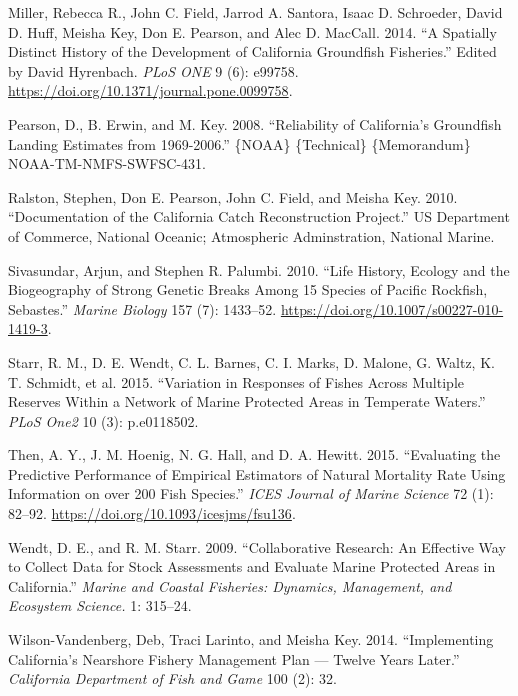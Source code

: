 \documentclass[11pt,
  english,
  letterpaper,
]{article}
\newlength{\cslhangindent}
\newenvironment{CSLReferences}[2] %
 {%
  \setlength{\parindent}{0pt}
  \ifodd #1 \everypar{\setlength{\hangindent}{\cslhangindent}}\ignorespaces\fi
  \ifnum #2 > 0
  \setlength{\parskip}{#2\baselineskip}
  \fi
 }%
 {}
\begin{document}
\begin{CSLReferences}{1}{0}
\leavevmode{}%
Miller, Rebecca R., John C. Field, Jarrod A. Santora, Isaac D. Schroeder, David D. Huff, Meisha Key, Don E. Pearson, and Alec D. MacCall. 2014. {``A {Spatially} {Distinct} {History} of the {Development} of {California} {Groundfish} {Fisheries}.''} Edited by David Hyrenbach. \emph{PLoS ONE} 9 (6): e99758. \url{https://doi.org/10.1371/journal.pone.0099758}.

\leavevmode{}%
Pearson, D., B. Erwin, and M. Key. 2008. {``Reliability of {California}'s {Groundfish} {Landing} {Estimates} from 1969-2006.''} \{NOAA\} \{Technical\} \{Memorandum\} NOAA-TM-NMFS-SWFSC-431.

\leavevmode{}%
Ralston, Stephen, Don E. Pearson, John C. Field, and Meisha Key. 2010. {``Documentation of the {California} Catch Reconstruction Project.''} US Department of Commerce, National Oceanic; Atmospheric Adminstration, National Marine.

\leavevmode{}%
Sivasundar, Arjun, and Stephen R. Palumbi. 2010. {``Life History, Ecology and the Biogeography of Strong Genetic Breaks Among 15 Species of {Pacific} Rockfish, {Sebastes}.''} \emph{Marine Biology} 157 (7): 1433--52. \url{https://doi.org/10.1007/s00227-010-1419-3}.

\leavevmode{}%
Starr, R. M., D. E. Wendt, C. L. Barnes, C. I. Marks, D. Malone, G. Waltz, K. T. Schmidt, et al. 2015. {``Variation in Responses of Fishes Across Multiple Reserves Within a Network of Marine Protected Areas in Temperate Waters.''} \emph{PLoS One2} 10 (3): p.e0118502.

\leavevmode{}%
Then, A. Y., J. M. Hoenig, N. G. Hall, and D. A. Hewitt. 2015. {``Evaluating the Predictive Performance of Empirical Estimators of Natural Mortality Rate Using Information on over 200 Fish Species.''} \emph{ICES Journal of Marine Science} 72 (1): 82--92. \url{https://doi.org/10.1093/icesjms/fsu136}.

\leavevmode{}%
Wendt, D. E., and R. M. Starr. 2009. {``Collaborative Research: An Effective Way to Collect Data for Stock Assessments and Evaluate Marine Protected Areas in {C}alifornia.''} \emph{Marine and Coastal Fisheries: Dynamics, Management, and Ecosystem Science.} 1: 315--24.

\leavevmode{}%
Wilson-Vandenberg, Deb, Traci Larinto, and Meisha Key. 2014. {``Implementing {California}'s {Nearshore} {Fishery} {Management} {Plan} --- Twelve Years Later.''} \emph{California Department of Fish and Game} 100 (2): 32.

\end{CSLReferences}
\end{document}
